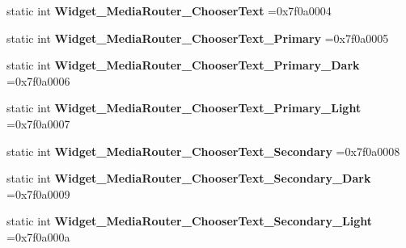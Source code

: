 \begin{DoxyCompactItemize}
\item 
\mbox{\label{classandroid_1_1support_1_1v7_1_1appcompat_1_1R_1_1style_aee6f74afe257f45fea553e8fd5b7ebc8}} 
static int {\bfseries Widget\+\_\+\+Media\+Router\+\_\+\+Chooser\+Text} =0x7f0a0004
\item 
\mbox{\label{classandroid_1_1support_1_1v7_1_1appcompat_1_1R_1_1style_a288ca2630264637f35fd196a363dbe00}} 
static int {\bfseries Widget\+\_\+\+Media\+Router\+\_\+\+Chooser\+Text\+\_\+\+Primary} =0x7f0a0005
\item 
\mbox{\label{classandroid_1_1support_1_1v7_1_1appcompat_1_1R_1_1style_a42cca99fa999727d648f69ac4bbe0ea0}} 
static int {\bfseries Widget\+\_\+\+Media\+Router\+\_\+\+Chooser\+Text\+\_\+\+Primary\+\_\+\+Dark} =0x7f0a0006
\item 
\mbox{\label{classandroid_1_1support_1_1v7_1_1appcompat_1_1R_1_1style_a025d7a8eb09169124de5f3d65473a18c}} 
static int {\bfseries Widget\+\_\+\+Media\+Router\+\_\+\+Chooser\+Text\+\_\+\+Primary\+\_\+\+Light} =0x7f0a0007
\item 
\mbox{\label{classandroid_1_1support_1_1v7_1_1appcompat_1_1R_1_1style_a29051ddfc16bc3d1df9777e3a2ffe029}} 
static int {\bfseries Widget\+\_\+\+Media\+Router\+\_\+\+Chooser\+Text\+\_\+\+Secondary} =0x7f0a0008
\item 
\mbox{\label{classandroid_1_1support_1_1v7_1_1appcompat_1_1R_1_1style_a2749e7883a2597478c6ddee13e45c8dd}} 
static int {\bfseries Widget\+\_\+\+Media\+Router\+\_\+\+Chooser\+Text\+\_\+\+Secondary\+\_\+\+Dark} =0x7f0a0009
\item 
\mbox{\label{classandroid_1_1support_1_1v7_1_1appcompat_1_1R_1_1style_ac1480726f267071d79ec11f0f507f815}} 
static int {\bfseries Widget\+\_\+\+Media\+Router\+\_\+\+Chooser\+Text\+\_\+\+Secondary\+\_\+\+Light} =0x7f0a000a
\item 
\mbox{\label{classandroid_1_1support_1_1v7_1_1appcompat_1_1R_1_1style_ad32b02752209bb86b6560ca6a997eb3f}} 

\end{DoxyCompactItemize}
